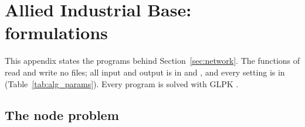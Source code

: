 \section{Allied Industrial Base: formulations}
\label{app:algorithm}

This appendix states the programs behind Section~\ref{sec:network}. The functions of
 read and write no files; all input and output is in
 and , and
every setting is in  (Table~\ref{tab:alg_params}). Every program is solved
with GLPK \citep{makhorin2020glpk}.

\subsection{The node problem}
\label{subsec:alg_node}

